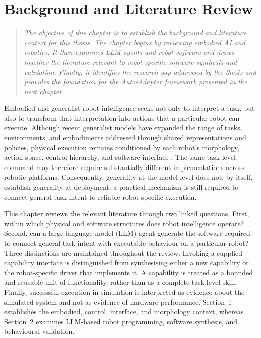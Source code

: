 \chapter[Background and Literature Review]{Background and Literature Review}
\label{chapter:background}

\begin{quote}\itshape
The objective of this chapter is to establish the background and literature
context for this thesis. The chapter begins by reviewing embodied AI and
robotics. It then examines LLM agents and robot software and draws together the
literature relevant to robot-specific software synthesis and validation.
Finally, it identifies the research gap addressed by the thesis and provides
the foundation for the Auto-Adapter framework presented in the next chapter.
\end{quote}

Embodied and generalist robot intelligence seeks not only to interpret a task,
but also to transform that interpretation into actions that a particular robot
can execute. Although recent generalist models have expanded the range of
tasks, environments, and embodiments addressed through shared representations
and policies, physical execution remains conditioned by each robot's
morphology, action space, control hierarchy, and software interface
\citep{brooks1991intelligence,brohan2022rt1,openxembodiment2024}. The same
task-level command may therefore require substantially different
implementations across robotic platforms. Consequently, generality at the
model level does not, by itself, establish generality at deployment: a
practical mechanism is still required to connect general task intent to
reliable robot-specific execution.

This chapter reviews the relevant literature through two linked questions.
First, within which physical and software structures does robot intelligence
operate? Second, can a large language model (LLM) agent generate the software
required to connect general task intent with executable behaviour on a
particular robot? Three distinctions are maintained throughout the review.
Invoking a supplied capability interface is distinguished from synthesising
either a new capability or the robot-specific driver that implements it. A
capability is treated as a bounded and reusable unit of functionality, rather
than as a complete task-level skill. Finally, successful execution in
simulation is interpreted as evidence about the simulated system and not as
evidence of hardware performance. Section~1 establishes the embodied,
control, interface, and morphology context, whereas Section~2 examines
LLM-based robot programming, software synthesis, and behavioural validation.

